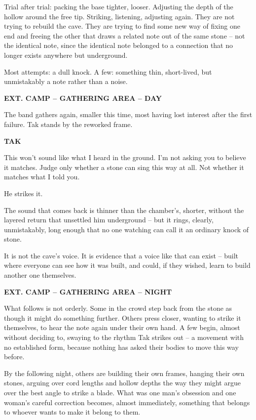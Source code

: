 \documentclass[12pt]{article}
\newcommand{\sceneheading}[1]{%
  \bigskip\noindent\textbf{#1}\par\smallskip
}
\newcommand{\action}[1]{%
  \noindent #1\par\medskip
}
\newcommand{\charcue}[1]{%
  \par\hspace*{2.2in}\textbf{#1}\par
}
\newenvironment{dialogue}{%
  \begin{list}{}{\leftmargin=1.5in\rightmargin=2in\itemsep=0pt\parsep=0pt\topsep=0pt}
  \item[]
}{%
  \end{list}\medskip
}
\begin{document}
\action{Trial after trial: packing the base tighter, looser. Adjusting the depth of the hollow around the free tip. Striking, listening, adjusting again. They are not trying to rebuild the cave. They are trying to find some new way of fixing one end and freeing the other that draws a related note out of the same stone -- not the identical note, since the identical note belonged to a connection that no longer exists anywhere but underground.}

\action{Most attempts: a dull knock. A few: something thin, short-lived, but unmistakably a note rather than a noise.}

\sceneheading{EXT. CAMP -- GATHERING AREA -- DAY}

\action{The band gathers again, smaller this time, most having lost interest after the first failure. Tak stands by the reworked frame.}

\charcue{TAK}
\begin{dialogue}
This won't sound like what I heard in the ground. I'm not asking you to believe it matches. Judge only whether a stone can sing this way at all. Not whether it matches what I told you.
\end{dialogue}

\action{He strikes it.}

\action{The sound that comes back is thinner than the chamber's, shorter, without the layered return that unsettled him underground -- but it rings, clearly, unmistakably, long enough that no one watching can call it an ordinary knock of stone.}

\action{It is not the cave's voice. It is evidence that a voice like that can exist -- built where everyone can see how it was built, and could, if they wished, learn to build another one themselves.}

\sceneheading{EXT. CAMP -- GATHERING AREA -- NIGHT}

\action{What follows is not orderly. Some in the crowd step back from the stone as though it might do something further. Others press closer, wanting to strike it themselves, to hear the note again under their own hand. A few begin, almost without deciding to, swaying to the rhythm Tak strikes out -- a movement with no established form, because nothing has asked their bodies to move this way before.}

\action{By the following night, others are building their own frames, hanging their own stones, arguing over cord lengths and hollow depths the way they might argue over the best angle to strike a blade. What was one man's obsession and one woman's careful correction becomes, almost immediately, something that belongs to whoever wants to make it belong to them.}
\end{document}
